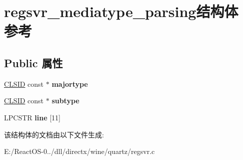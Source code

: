 \hypertarget{structregsvr__mediatype__parsing}{}\section{regsvr\+\_\+mediatype\+\_\+parsing结构体 参考}
\label{structregsvr__mediatype__parsing}
\subsection*{Public 属性}
\begin{DoxyCompactItemize}
\item 
\mbox{\label{structregsvr__mediatype__parsing_a8f0c8d24274dee8c0e3f9c53d4f7701b}} 
\hyperlink{struct___i_i_d}{C\+L\+S\+ID} const  $\ast$ {\bfseries majortype}
\item 
\mbox{\label{structregsvr__mediatype__parsing_ac350d8c3a5e79e4c25c1d705e25663b2}} 
\hyperlink{struct___i_i_d}{C\+L\+S\+ID} const  $\ast$ {\bfseries subtype}
\item 
\mbox{\label{structregsvr__mediatype__parsing_a67cbb320b947cc1dbd46489c759abfe6}} 
L\+P\+C\+S\+TR {\bfseries line} \mbox{[}11\mbox{]}
\end{DoxyCompactItemize}


该结构体的文档由以下文件生成\+:\begin{DoxyCompactItemize}
\item 
E\+:/\+React\+O\+S-\/0../dll/directx/wine/quartz/regsvr.\+c\end{DoxyCompactItemize}
